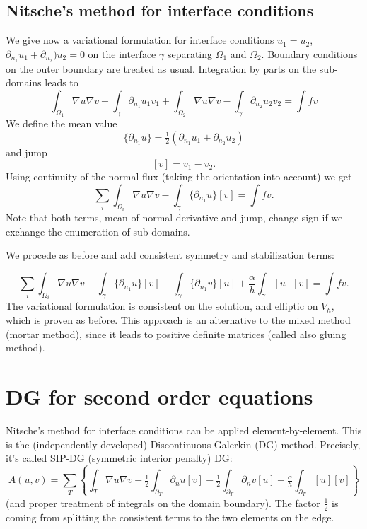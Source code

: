 \subsection{Nitsche's method for interface conditions}
We give now a variational formulation for interface conditions $u_1 =
u_2$, $\partial_{n_1} u_1 + \partial_{n_2}) u_2 = 0$ on the interface
$\gamma$ separating $\Omega_1$ and $\Omega_2$. Boundary conditions on
 the outer boundary are treated as usual. Integration by parts on the
 sub-domains leads to
$$
\int_{\Omega_1} \nabla u \nabla v - \int_\gamma \partial_{n_1} u_1 v_1  + 
\int_{\Omega_2} \nabla u \nabla v - \int_\gamma \partial_{n_2} u_2 v_2 =
\int f v
$$
We define the mean value
$$
\{ \partial_{n_1} u \} = \tfrac{1}{2} ( \partial_{n_1} u_1
+ \partial_{n_2} u_2 )
$$
and jump 
$$
[v] = v_1 - v_2.
$$
Using continuity of the normal flux (taking the orientation into
account) we get
$$
\sum_i \int_{\Omega_i} \nabla u \nabla v - \int_{\gamma}
\{ \partial_{n_1} u \}  [v] = 
\int f v.  
$$ 
Note that both terms, mean of normal derivative and jump, change sign
if we exchange the enumeration of sub-domains.

We procede as before and add consistent symmetry and stabilization
terms:

$$
\sum_i \int_{\Omega_i} \nabla u \nabla v - 
\int_{\gamma} \{ \partial_{n_1} u \}  [v] -
\int_{\gamma} \{ \partial_{n_1} v \}  [u] +
\frac{\alpha}{h} \int_{\gamma} [u ] [v] =
\int f v. 
$$
The variational formulation  is consistent on the solution, and
elliptic on  $V_h$, which is proven as before. This approach is an alternative to the
mixed method (mortar method), since it leads to positive definite
matrices (called also gluing method). 

\section{DG for second order equations}
Nitsche's method for interface conditions can be applied
element-by-element. This is the (independently developed)
Discontinuous Galerkin (DG) method. Precisely, it's called SIP-DG
(symmetric interior penalty)  DG:
$$
A(u,v) = \sum_T \left\{ \int_T \nabla u \nabla v
  - \tfrac{1}{2} \int_{\partial_T} \partial_n u [v]  
- \tfrac{1}{2} \int_{\partial_T} \partial_n v [u] 
  +  \tfrac{\alpha}{h} \int_{\partial_T} [u] [v] \right\}
$$
(and proper treatment of integrals on the domain boundary). The
factor $\tfrac{1}{2}$ is coming from splitting the consistent terms to
the two elements on the edge.

